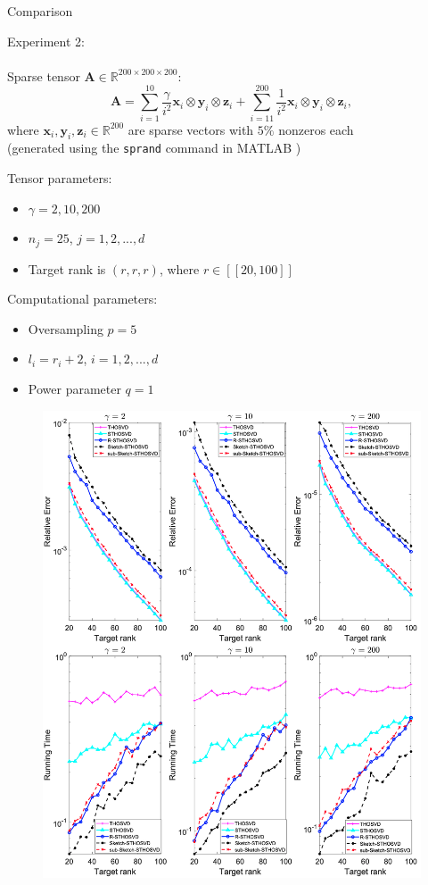 \documentclass{beamer}
\newcommand{\bvec}[1]{\mathbf{#1}}
\newcommand{\vx}{\bvec{x}}
\newcommand{\vy}{\bvec{y}}
\newcommand{\vz}{\bvec{z}}
\newcommand{\vA}{\bvec{A}}
\newcommand{\bitem}{\item[$\bullet$]}
\begin{document}
\begin{frame}{Comparison}

Experiment 2:\\
~\\
Sparse tensor $\vA\in\mathbb{R}^{200\times  200 \times 200}$:
$$
\vA 
=
\sum_{i=1}^{10}
\frac{\gamma}{i^2} \vx_i \otimes \vy_i \otimes \vz_i 
+
\sum_{i=11}^{200}
\frac{1}{i^2} \vx_i \otimes \vy_i \otimes \vz_i,
$$
where $ \vx_i ,\vy_i , \vz_i \in \mathbb{R}^{200}$ are sparse vectors with $5\%$ nonzeros each \\
(generated using the \texttt{sprand} command in MATLAB )

Tensor parameters:
\begin{itemize}
\bitem $\gamma = 2, 10, 200$ \vspace{-1.5mm}
\bitem $n_j = 25$, $j = 1, 2, . . . , d$ \vspace{-1.5mm}
\bitem Target rank is $(r, r, r)$, where $r \in [\![20, 100]\!]$
\end{itemize}

Computational parameters:
\begin{itemize}
\bitem Oversampling $p = 5$  \vspace{-1.5mm}
\bitem $l_i = r_i+2$, $i= 1, 2, . . . , d$ \vspace{-1.5mm}
\bitem Power parameter $q=1$
\end{itemize}
\end{frame}

\begin{frame}{}

\begin{figure}
    \centering
    \includegraphics[width = 0.6 \textwidth]{Graphics/SparseFig.png}
\end{figure}
    
\end{frame}
\end{document}
